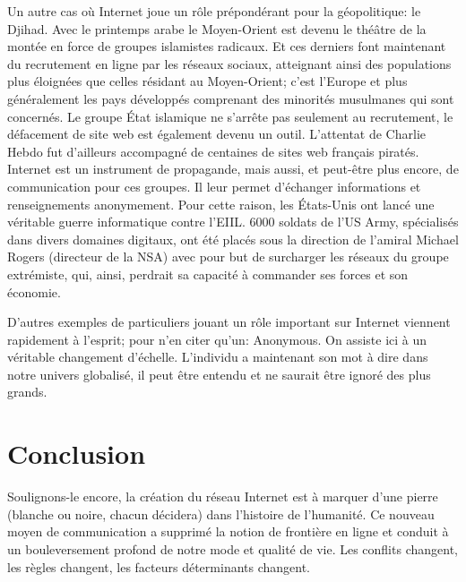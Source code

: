 \documentclass[article, french]{yReport}
\begin{document}
	Un autre cas où Internet joue un rôle prépondérant pour la géopolitique: le Djihad.
	Avec le printemps arabe le Moyen-Orient est devenu le théâtre de la montée en force de groupes islamistes radicaux.
	Et ces derniers font maintenant du recrutement en ligne par les réseaux sociaux, atteignant ainsi des populations plus éloignées que celles résidant au Moyen-Orient; c'est l'Europe et plus généralement les pays développés comprenant des minorités musulmanes qui sont concernés.
	Le groupe État islamique ne s'arrête pas seulement au recrutement, le défacement de site web est également devenu un outil.
	L'attentat de Charlie Hebdo fut d'ailleurs accompagné de centaines de sites web français piratés.
	Internet est un instrument de propagande, mais aussi, et peut-être plus encore, de communication pour ces groupes.
	Il leur permet d'échanger informations et renseignements anonymement.
	Pour cette raison, les États-Unis ont lancé une véritable guerre informatique contre l'EIIL.
	6000 soldats de l'US Army, spécialisés dans divers domaines digitaux, ont été placés sous la direction de l'amiral Michael Rogers (directeur de la NSA) avec pour but de surcharger les réseaux du groupe extrémiste, qui, ainsi, perdrait sa capacité à commander ses forces et son économie.
	
	D'autres exemples de particuliers jouant un rôle important sur Internet viennent rapidement à l'esprit; pour n'en citer qu'un: Anonymous.
	On assiste ici à un véritable changement d'échelle.
	L'individu a maintenant son mot à dire dans notre univers globalisé, il peut être entendu et ne saurait être ignoré des plus grands.
	
	\section{Conclusion}
	Soulignons-le encore, la création du réseau Internet est à marquer d'une pierre (blanche ou noire, chacun décidera) dans l'histoire de l'humanité.
	Ce nouveau moyen de communication a supprimé la notion de frontière en ligne et conduit à un bouleversement profond de notre mode et qualité de vie.
	Les conflits changent, les règles changent, les facteurs déterminants changent.
	
\end{document}
